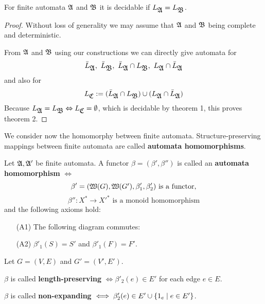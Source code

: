 \bigskip
\begin{theorem}
For finite automata $\mbox{$\mathfrak{A}$}$ and $\mbox{$\mathfrak{B}$}$ it is decidable if $L_{\mbox{$\mathfrak{A}$}} =
L_{\mbox{$\mathfrak{B}$}}$.
\end{theorem}

\begin{proof}
Without loss of generality we may assume that $\mbox{$\mathfrak{A}$}$ and $\mbox{$\mathfrak{B}$}$ being
complete and deterministic.

From $\mbox{$\mathfrak{A}$}$ and $\mbox{$\mathfrak{B}$}$ using our constructions we can directly give automata
for
\[\bar{L}_{\fa{A}},\ \bar{L}_{\fa{B}},\ \bar{L}_{\fa{A}} \cap L_{\fa{B}},\ 
L_{\fa{A}} \cap \bar{L}_{\fa{A}} \]
and also for 
\[ L_{\mbox{$\mathfrak{C}$}} := (\bar{L}_{\mbox{$\mathfrak{A}$}} \cap L_{\mbox{$\mathfrak{B}$}}) \cup (L_{\mbox{$\mathfrak{A}$}} \cap
\bar{L}_{\mbox{$\mathfrak{A}$}}) \]
Because $L_{\mbox{$\mathfrak{A}$}} = L_{\mbox{$\mathfrak{B}$}} \Leftrightarrow L_{\mbox{$\mathfrak{C}$}} = \emptyset$, which
is decidable by theorem 1, this proves theorem 2.
\end{proof}

\bigskip
We consider now the homomorphy between finite automata. Structure-preserving
mappings between finite automata are called {\bf automata homomorphisms}.

\begin{definition}
Let $\mbox{$\mathfrak{A}$}, \mbox{$\mathfrak{A'}$}$ be finite automata. A functor $\beta = (\beta', \beta'')$
is called an {\bf automata homomorphism} $\iff$
\[ \beta' = (\mbox{$\mathfrak{W}({G})$}, \mbox{$\mathfrak{W}({G'})$}, \beta'_1, \beta'_2)\text{ is a functor,}
\]
\[ \beta'': X^* \to X'^*	\text{ is a monoid homomorphism} \]
and the following axioms hold:
\begin{itemize}
  \item[(A1)] The following diagram commutes:
  
  
  \item[(A2)] $\beta'_1(S) = S'$ and $\beta'_1(F) = F'$. 
\end{itemize}

Let $G = (V,E)$ and $G' = (V', E')$.

$\beta$ is called {\bf length-preserving} $\iff \beta'_2(e) \in E'$ for each
edge $e \in E$.

$\beta$ is called {\bf non-expanding} $\iff \beta_2'(e) \in E' \cup \mbox{$\{1_e
\mid e \in E'\}$}$.
\end{definition}

